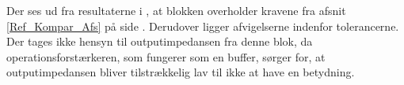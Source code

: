 \noindent Der ses ud fra resultaterne i , at blokken overholder kravene fra afsnit \ref{Ref_Kompar_Afs} på side \pageref{Ref_Kompar_Afs}. Derudover ligger afvigelserne indenfor tolerancerne. \\
Der tages ikke hensyn til outputimpedansen fra denne blok, da operationsforstærkeren, som fungerer som en buffer, sørger for, at outputimpedansen bliver tilstrækkelig lav til ikke at have en betydning.